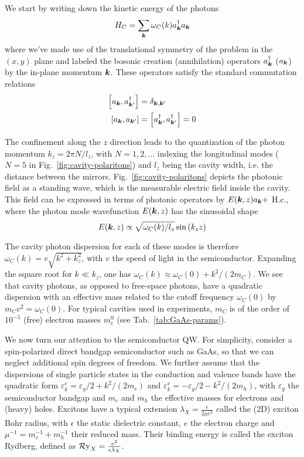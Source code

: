 We start by writing down the kinetic energy of the photons
%
\begin{equation}\label{eq:cavity-energy}
  H_{C} = \sum_{\bm{k}} \omega_C(k) a_{\bm{k}}^{\dagger} a_{\bm{k}}
\end{equation}
% 
where we've made use of the translational symmetry of the problem in
the $(x,y)$ plane and labeled the bosonic creation (annihilation)
operators $a_{\bm{k}}^{\dagger}$ ($a_{\bm{k}}$) by the in-plane momentum
$\bm{k}$. These operators satisfy the standard commutation relations
\begin{align}
  \left[a_{\bm{k}}, a_{\bm{k}^{\prime}}^{\dagger}\right] & =\delta_{\bm{k},\bm{k}^{\prime}}\\
  \left[a_{\bm{k}}, a_{\bm{k}^{\prime}}\right] & =\left[a_{\bm{k}}^{\dagger}, a_{\bm{k}^{\prime}}^{\dagger}\right] = 0
\end{align}

The confinement along the $z$ direction leads to the quantization of
the photon momentum $k_z = 2 \pi N/l_z$, with $N = 1,2,\dots$
indexing the longitudinal modes ($N=5$ in
Fig.~\ref{fig:cavity-polaritons}) and $l_z$ being the cavity width,
i.e. the distance between the
mirrors. Fig.~\ref{fig:cavity-polaritons} depicts the photonic field
as a standing wave, which is the measurable electric field inside the
cavity. This field can be expressed in terms of photonic operators by
$E(\bm{k},z)a_{\bm{k}} +$ H.c., where the photon mode wavefunction
$E(\bm{k},z)$ has the sinusoidal shape~\cite{Carusotto_2013}
%
\begin{equation}\label{eq:electric-field}
  E(\bm{k},z) \propto \sqrt{\omega_C(k)/l_z} \sin \left(k_z z\right)
\end{equation}
% 


The cavity photon dispersion for each of these modes is therefore
$\omega_C(k) = v \sqrt{k^2 + k_z^2}$, with $v$ the speed of light in
the semiconductor. Expanding the square root for $k \ll k_z$, one has
$\omega_C(k) \approx \omega_C(0) + k^2/(2m_{C})$. We see that
cavity photons, as opposed to free-space photons, have a quadratic
dispersion with an effective mass related to the cutoff frequency
$\omega_C(0)$ by $m_{C} v^2 = \omega_C(0)$. For typical cavities used
in experiments, $m_{C}$ is of the order of $10^{-5}$ (free) electron
masses $m_e^0$ (see Tab.~\ref{tab:GaAs-params}).

We now turn our attention to the semiconductor QW. For simplicity,
consider a spin-polarized direct bandgap semiconductor such as GaAs,
so that we can neglect additional spin degrees of freedom. We further
assume that the dispersions of single particle states in the
conduction and valence bands have the quadratic form
$\varepsilon^c_{k} = \varepsilon_g/2 + k^2/(2m_e)$ and
$\varepsilon^v_{k} = - \varepsilon_g/2 - k^2/(2m_h)$, with
$\varepsilon_g$ the semiconductor bandgap and $m_e$ and $m_h$ the
effective masses for electrons and (heavy) holes. Excitons have a
typical extension $\lambda_X = \frac{\epsilon}{2\mu e^2}$ called the
(2D) exciton Bohr radius, with $\epsilon$ the static dielectric
constant, $e$ the electron charge and $\mu^{-1} = m_e^{-1} + m_h^{-1}$
their reduced mass. Their binding energy is called the exciton
Rydberg, defined as $\operatorname{\mathcal{R}y}_X = \frac{e^2}{\epsilon \lambda_X}$.

